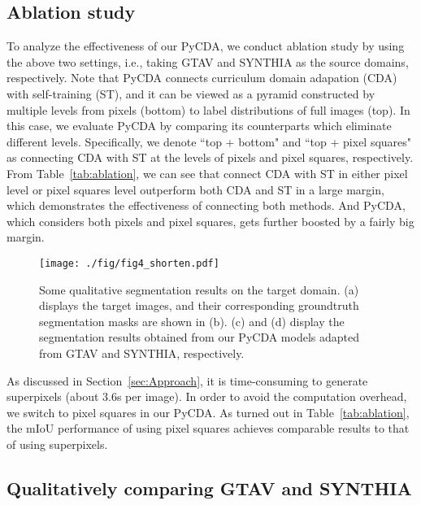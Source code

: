 \documentclass[10pt,twocolumn,letterpaper]{article}
\begin{document}
\subsection{Ablation study}
To analyze the effectiveness of our PyCDA, we conduct ablation study by using the above two settings, i.e., taking GTAV and SYNTHIA as the source domains, respectively. Note that PyCDA connects curriculum domain adapation (CDA) with self-training (ST), and it can be viewed as a pyramid constructed by multiple levels from pixels (bottom) to label distributions of full images (top). In this case, we evaluate PyCDA by comparing its counterparts which eliminate different levels. Specifically, we denote ``top + bottom" and ``top + pixel squares" as connecting CDA with ST at the levels of pixels and pixel squares, respectively. From Table~\ref{tab:ablation}, we can see that connect CDA with ST in either pixel level or pixel squares level outperform both CDA and ST in a large margin, which demonstrates the effectiveness of connecting both methods.
And PyCDA, which considers both pixels and pixel squares, gets further boosted by a fairly big margin.

\begin{figure*}[]
    \centering
    \texttt{[image: ./fig/fig4\_shorten.pdf]}
    \vspace{-3mm}
	\caption{Some qualitative segmentation results on the target domain. (a) displays the target images, and their corresponding groundtruth segmentation masks are shown in (b). (c) and (d) display the segmentation results obtained from our PyCDA models adapted from GTAV and SYNTHIA, respectively.}
	\label{fig:qualitative}
	\vspace{-5mm}
\end{figure*}
\vspace{3pt}
\vspace{3pt}
 As discussed in Section~\ref{sec:Approach}, it is time-consuming to generate superpixels (about 3.6s per image). In order to avoid the computation overhead, we switch to pixel squares in our PyCDA. As turned out in Table~\ref{tab:ablation}, the mIoU performance of using pixel squares achieves comparable results to that of using superpixels.


\subsection{Qualitatively comparing GTAV and SYNTHIA}
\end{document}
